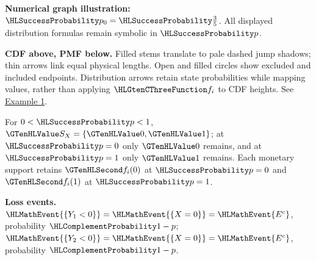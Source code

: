 {\begin{center}
\end{center}
\textbf{Numerical graph illustration:} $\SuccessProb{p_0}=\SuccessProb{\frac{3}{5}}$. All displayed distribution formulas remain symbolic in $\SuccessProb{p}$.
\par\textbf{CDF above, PMF below.} Filled stems translate to pale dashed jump shadows; thin arrows link equal physical lengths. Open and filled circles show excluded and included endpoints. Distribution arrows retain state probabilities while mapping values, rather than applying $\TransformationFunction{f_i}$ to CDF heights. See \hyperref[ex:intro-one]{Example 1}.\par
For $0<\SuccessProb{p}<1$, $\Indicator{S_X}=\{\Indicator{0},\Indicator{1}\}$; at $\SuccessProb{p}=0$ only $\Indicator{0}$ remains, and at $\SuccessProb{p}=1$ only $\Indicator{1}$ remains. Each monetary support retains $\Money{f_i(0)}$ at $\SuccessProb{p}=0$ and $\Money{f_i(1)}$ at $\SuccessProb{p}=1$.
\par\textbf{Loss events.} $\HLMathEvent{\{Y_1<0\}}=\HLMathEvent{\{X=0\}}=\HLMathEvent{E^c}$, probability $\FailureProb{1-p}$; $\HLMathEvent{\{Y_2<0\}}=\HLMathEvent{\{X=0\}}=\HLMathEvent{E^c}$, probability $\FailureProb{1-p}$.
\endgroup
}
